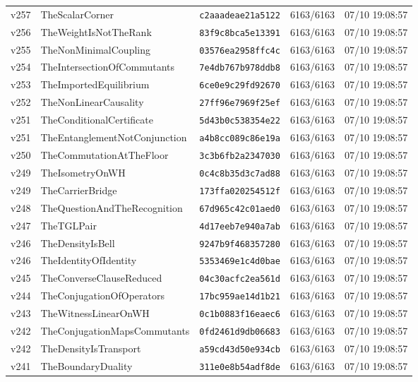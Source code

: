 \documentclass[11pt]{article}
\theoremstyle{definition}\newtheorem{deriv}{Derivation}
\begin{document}
{\begin{longtable}{@{}lllll@{}}
v257 & TheScalarCorner & \texttt{c2aaadeae21a5122} & 6163/6163 & 07/10 19:08:57 \\
v256 & TheWeightIsNotTheRank & \texttt{83f9c8bca5e13391} & 6163/6163 & 07/10 19:08:57 \\
v255 & TheNonMinimalCoupling & \texttt{03576ea2958ffc4c} & 6163/6163 & 07/10 19:08:57 \\
v254 & TheIntersectionOfCommutants & \texttt{7e4db767b978ddb8} & 6163/6163 & 07/10 19:08:57 \\
v253 & TheImportedEquilibrium & \texttt{6ce0e9c29fd92670} & 6163/6163 & 07/10 19:08:57 \\
v252 & TheNonLinearCausality & \texttt{27ff96e7969f25ef} & 6163/6163 & 07/10 19:08:57 \\
v251 & TheConditionalCertificate & \texttt{5d43b0c538354e22} & 6163/6163 & 07/10 19:08:57 \\
v251 & TheEntanglementNotConjunction & \texttt{a4b8cc089c86e19a} & 6163/6163 & 07/10 19:08:57 \\
v250 & TheCommutationAtTheFloor & \texttt{3c3b6fb2a2347030} & 6163/6163 & 07/10 19:08:57 \\
v249 & TheIsometryOnWH & \texttt{0c4c8b35d3c7ad88} & 6163/6163 & 07/10 19:08:57 \\
v249 & TheCarrierBridge & \texttt{173ffa020254512f} & 6163/6163 & 07/10 19:08:57 \\
v248 & TheQuestionAndTheRecognition & \texttt{67d965c42c01aed0} & 6163/6163 & 07/10 19:08:57 \\
v247 & TheTGLPair & \texttt{4d17eeb7e940a7ab} & 6163/6163 & 07/10 19:08:57 \\
v246 & TheDensityIsBell & \texttt{9247b9f468357280} & 6163/6163 & 07/10 19:08:57 \\
v246 & TheIdentityOfIdentity & \texttt{5353469e1c4d0bae} & 6163/6163 & 07/10 19:08:57 \\
v245 & TheConverseClauseReduced & \texttt{04c30acfc2ea561d} & 6163/6163 & 07/10 19:08:57 \\
v244 & TheConjugationOfOperators & \texttt{17bc959ae14d1b21} & 6163/6163 & 07/10 19:08:57 \\
v243 & TheWitnessLinearOnWH & \texttt{0c1b0883f16eaec6} & 6163/6163 & 07/10 19:08:57 \\
v242 & TheConjugationMapsCommutants & \texttt{0fd2461d9db06683} & 6163/6163 & 07/10 19:08:57 \\
v242 & TheDensityIsTransport & \texttt{a59cd43d50e934cb} & 6163/6163 & 07/10 19:08:57 \\
v241 & TheBoundaryDuality & \texttt{311e0e8b54adf8de} & 6163/6163 & 07/10 19:08:57 \\

\end{longtable}}
\end{document}
